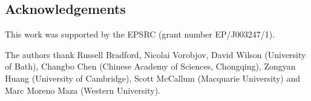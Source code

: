 \documentclass[runningheads,a4paper]{llncs}
\begin{document}
\subsection*{Acknowledgements}

This work was supported by the EPSRC (grant number EP/J003247/1).  

The authors thank Russell Bradford,
Nicolai Vorobjov, David Wilson (University of Bath), Changbo Chen (Chinese Academy of Sciences, Chongqing), Zongyan Huang (University of Cambridge), Scott McCallum (Macquarie University) and Marc Moreno Maza (Western University).

\end{document}
